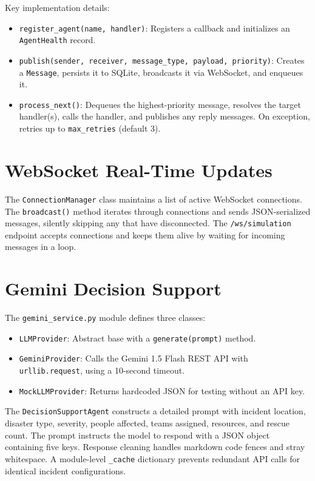 Key implementation details:

\begin{itemize}[leftmargin=*]
    \item \texttt{register\_agent(name, handler)}: Registers a callback and initializes an \texttt{AgentHealth} record.
    \item \texttt{publish(sender, receiver, message\_type, payload, priority)}: Creates a \texttt{Message}, persists it to SQLite, broadcasts it via WebSocket, and enqueues it.
    \item \texttt{process\_next()}: Dequeues the highest-priority message, resolves the target handler(s), calls the handler, and publishes any reply messages. On exception, retries up to \texttt{max\_retries} (default 3).
\end{itemize}

\section{WebSocket Real-Time Updates}
\label{sec:impl_websocket}

The \texttt{ConnectionManager} class maintains a list of active WebSocket connections. The \texttt{broadcast()} method iterates through connections and sends JSON-serialized messages, silently skipping any that have disconnected. The \texttt{/ws/simulation} endpoint accepts connections and keeps them alive by waiting for incoming messages in a loop.

\section{Gemini Decision Support}
\label{sec:impl_gemini}

The \texttt{gemini\_service.py} module defines three classes:

\begin{itemize}[leftmargin=*]
    \item \texttt{LLMProvider}: Abstract base with a \texttt{generate(prompt)} method.
    \item \texttt{GeminiProvider}: Calls the Gemini 1.5 Flash REST API with \texttt{urllib.request}, using a 10-second timeout.
    \item \texttt{MockLLMProvider}: Returns hardcoded JSON for testing without an API key.
\end{itemize}

The \texttt{DecisionSupportAgent} constructs a detailed prompt with incident location, disaster type, severity, people affected, teams assigned, resources, and rescue count. The prompt instructs the model to respond with a JSON object containing five keys. Response cleaning handles markdown code fences and stray whitespace. A module-level \texttt{\_cache} dictionary prevents redundant API calls for identical incident configurations.

